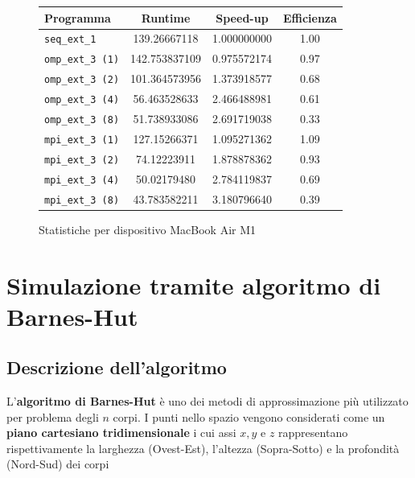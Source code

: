 \documentclass[12pt]{report}
\begin{document}
    \begin{figure}[H]
        \centering

        \begin{tabular}{ l | c | c | c }
            \textbf{Programma} & \textbf{Runtime} & \textbf{Speed-up} & \textbf{Efficienza}\\
            \hline
            \texttt{seq\_ext\_1} & 139.26667118 & 1.000000000 & 1.00 \\
            \hline
            \texttt{omp\_ext\_3 (1)} & 142.753837109 & 0.975572174 & 0.97 \\
            \texttt{omp\_ext\_3 (2)} & 101.364573956 & 1.373918577 & 0.68 \\
            \texttt{omp\_ext\_3 (4)} & 56.463528633 & 2.466488981 & 0.61 \\
            \texttt{omp\_ext\_3 (8)} & 51.738933086 & 2.691719038 & 0.33 \\
            \hline
            \texttt{mpi\_ext\_3 (1)} & 127.15266371 & 1.095271362 & 1.09 \\
            \texttt{mpi\_ext\_3 (2)} & 74.12223911 & 1.878878362 & 0.93 \\
            \texttt{mpi\_ext\_3 (4)} & 50.02179480 & 2.784119837 & 0.69 \\
            \texttt{mpi\_ext\_3 (8)} & 43.783582211 & 3.180796640 & 0.39 \\
        \end{tabular}
        \caption{Statistiche per dispositivo MacBook Air M1}
        \label{fig:stats_m1_1}
    \end{figure}


    \chapter{Simulazione tramite algoritmo di Barnes-Hut}

    \section{Descrizione dell'algoritmo}

    L'\textbf{algoritmo di Barnes-Hut} è uno dei metodi di approssimazione più utilizzato per problema degli $n$ corpi. I punti nello spazio vengono considerati come un \textbf{piano cartesiano tridimensionale} i cui assi $x,y$ e $z$ rappresentano rispettivamente la larghezza (Ovest-Est), l'altezza (Sopra-Sotto) e la profondità (Nord-Sud) dei corpi
        
\end{document}
